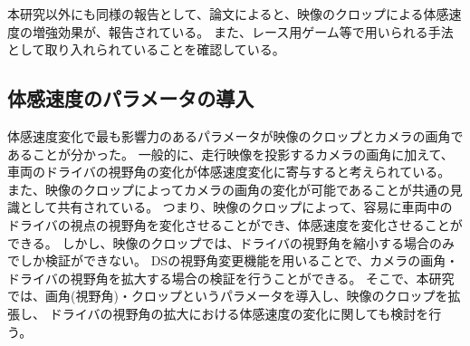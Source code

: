 本研究以外にも同様の報告として、論文によると、映像のクロップによる体感速度の増強効果が、報告されている。
また、レース用ゲーム等で用いられる手法として取り入れられていることを確認している。

\clearpage

\subsection{体感速度のパラメータの導入}
体感速度変化で最も影響力のあるパラメータが映像のクロップとカメラの画角であることが分かった。
一般的に、走行映像を投影するカメラの画角に加えて、車両のドライバの視野角の変化が体感速度変化に寄与すると考えられている。
また、映像のクロップによってカメラの画角の変化が可能であることが共通の見識として共有されている。
つまり、映像のクロップによって、容易に車両中のドライバの視点の視野角を変化させることができ、体感速度を変化させることができる。
しかし、映像のクロップでは、ドライバの視野角を縮小する場合のみでしか検証ができない。
DSの視野角変更機能を用いることで、カメラの画角・ドライバの視野角を拡大する場合の検証を行うことができる。
そこで、本研究では、画角(視野角)・クロップというパラメータを導入し、映像のクロップを拡張し、
ドライバの視野角の拡大における体感速度の変化に関しても検討を行う。